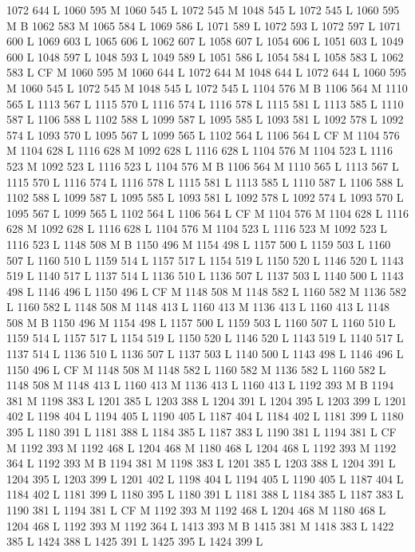 {{{{{{{{{{{{{{{{{{1072 644 L
1060 595 M 1060 545 L
1072 545 M 1048 545 L
1072 545 L
1060 595 M B
1062 583 M 1065 584 L
1069 586 L
1071 589 L
1072 593 L
1072 597 L
1071 600 L
1069 603 L
1065 606 L
1062 607 L
1058 607 L
1054 606 L
1051 603 L
1049 600 L
1048 597 L
1048 593 L
1049 589 L
1051 586 L
1054 584 L
1058 583 L
1062 583 L
CF M
1060 595 M 1060 644 L
1072 644 M 1048 644 L
1072 644 L
1060 595 M 1060 545 L
1072 545 M 1048 545 L
1072 545 L
1104 576 M B
1106 564 M 1110 565 L
1113 567 L
1115 570 L
1116 574 L
1116 578 L
1115 581 L
1113 585 L
1110 587 L
1106 588 L
1102 588 L
1099 587 L
1095 585 L
1093 581 L
1092 578 L
1092 574 L
1093 570 L
1095 567 L
1099 565 L
1102 564 L
1106 564 L
CF M
1104 576 M 1104 628 L
1116 628 M 1092 628 L
1116 628 L
1104 576 M 1104 523 L
1116 523 M 1092 523 L
1116 523 L
1104 576 M B
1106 564 M 1110 565 L
1113 567 L
1115 570 L
1116 574 L
1116 578 L
1115 581 L
1113 585 L
1110 587 L
1106 588 L
1102 588 L
1099 587 L
1095 585 L
1093 581 L
1092 578 L
1092 574 L
1093 570 L
1095 567 L
1099 565 L
1102 564 L
1106 564 L
CF M
1104 576 M 1104 628 L
1116 628 M 1092 628 L
1116 628 L
1104 576 M 1104 523 L
1116 523 M 1092 523 L
1116 523 L
1148 508 M B
1150 496 M 1154 498 L
1157 500 L
1159 503 L
1160 507 L
1160 510 L
1159 514 L
1157 517 L
1154 519 L
1150 520 L
1146 520 L
1143 519 L
1140 517 L
1137 514 L
1136 510 L
1136 507 L
1137 503 L
1140 500 L
1143 498 L
1146 496 L
1150 496 L
CF M
1148 508 M 1148 582 L
1160 582 M 1136 582 L
1160 582 L
1148 508 M 1148 413 L
1160 413 M 1136 413 L
1160 413 L
1148 508 M B
1150 496 M 1154 498 L
1157 500 L
1159 503 L
1160 507 L
1160 510 L
1159 514 L
1157 517 L
1154 519 L
1150 520 L
1146 520 L
1143 519 L
1140 517 L
1137 514 L
1136 510 L
1136 507 L
1137 503 L
1140 500 L
1143 498 L
1146 496 L
1150 496 L
CF M
1148 508 M 1148 582 L
1160 582 M 1136 582 L
1160 582 L
1148 508 M 1148 413 L
1160 413 M 1136 413 L
1160 413 L
1192 393 M B
1194 381 M 1198 383 L
1201 385 L
1203 388 L
1204 391 L
1204 395 L
1203 399 L
1201 402 L
1198 404 L
1194 405 L
1190 405 L
1187 404 L
1184 402 L
1181 399 L
1180 395 L
1180 391 L
1181 388 L
1184 385 L
1187 383 L
1190 381 L
1194 381 L
CF M
1192 393 M 1192 468 L
1204 468 M 1180 468 L
1204 468 L
1192 393 M 1192 364 L
1192 393 M B
1194 381 M 1198 383 L
1201 385 L
1203 388 L
1204 391 L
1204 395 L
1203 399 L
1201 402 L
1198 404 L
1194 405 L
1190 405 L
1187 404 L
1184 402 L
1181 399 L
1180 395 L
1180 391 L
1181 388 L
1184 385 L
1187 383 L
1190 381 L
1194 381 L
CF M
1192 393 M 1192 468 L
1204 468 M 1180 468 L
1204 468 L
1192 393 M 1192 364 L
1413 393 M B
1415 381 M 1418 383 L
1422 385 L
1424 388 L
1425 391 L
1425 395 L
1424 399 L
}}}}}}}}}}}}}}}}}}
